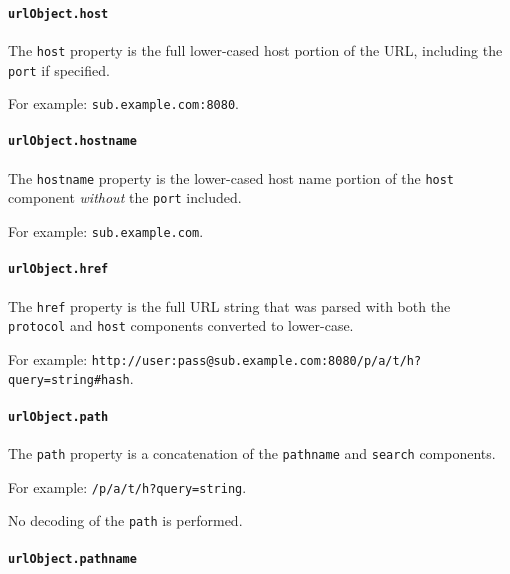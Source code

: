 \paragraph{\texorpdfstring{\texttt{urlObject.host}}{urlObject.host}}\label{urlobject.host}

The \texttt{host} property is the full lower-cased host portion of the
URL, including the \texttt{port} if specified.

For example:
\texttt{\textquotesingle{}sub.example.com:8080\textquotesingle{}}.

\paragraph{\texorpdfstring{\texttt{urlObject.hostname}}{urlObject.hostname}}\label{urlobject.hostname}

The \texttt{hostname} property is the lower-cased host name portion of
the \texttt{host} component \emph{without} the \texttt{port} included.

For example:
\texttt{\textquotesingle{}sub.example.com\textquotesingle{}}.

\paragraph{\texorpdfstring{\texttt{urlObject.href}}{urlObject.href}}\label{urlobject.href}

The \texttt{href} property is the full URL string that was parsed with
both the \texttt{protocol} and \texttt{host} components converted to
lower-case.

For example:
\texttt{\textquotesingle{}http://user:pass@sub.example.com:8080/p/a/t/h?query=string\#hash\textquotesingle{}}.

\paragraph{\texorpdfstring{\texttt{urlObject.path}}{urlObject.path}}\label{urlobject.path}

The \texttt{path} property is a concatenation of the \texttt{pathname}
and \texttt{search} components.

For example:
\texttt{\textquotesingle{}/p/a/t/h?query=string\textquotesingle{}}.

No decoding of the \texttt{path} is performed.

\paragraph{\texorpdfstring{\texttt{urlObject.pathname}}{urlObject.pathname}}\label{urlobject.pathname}

